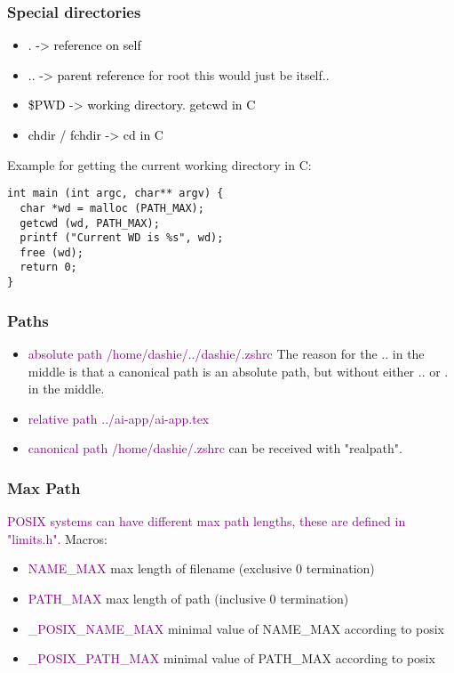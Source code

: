 \documentclass[main.tex,fontsize=8pt,paper=a4,paper=portrait,DIV=calc,]{scrartcl}
\begin{document}
\subsubsection{Special directories}
\begin{itemize}
\item \textcolor{black}{. -> reference on self}
\item \textcolor{black}{.. -> parent reference}\newline
  for root this would just be itself..
\item \textcolor{black}{\$PWD -> working directory. getcwd in C}
\item \textcolor{black}{chdir / fchdir -> cd in C}
\end{itemize} 
Example for getting the current working directory in C:
\begin{lstlisting}
int main (int argc, char** argv) {
  char *wd = malloc (PATH_MAX);
  getcwd (wd, PATH_MAX);
  printf ("Current WD is %s", wd);
  free (wd);
  return 0;
}
\end{lstlisting}

\subsubsection{Paths}
\begin{itemize}
\item \textcolor{purple}{absolute path /home/dashie/../dashie/.zshrc}\newline
  The reason for the .. in the middle is that a canonical path is an absolute path, but without either .. or . in the middle.
\item \textcolor{purple}{relative path ../ai-app/ai-app.tex}
\item \textcolor{purple}{canonical path /home/dashie/.zshrc}\newline
  can be received with "realpath".
\end{itemize}

\subsubsection{Max Path}
\textcolor{purple}{POSIX systems can have different max path lengths, these are defined in "limits.h".}\newline
Macros: 
\begin{itemize}
\item \textcolor{purple}{NAME\_MAX} max length of filename (exclusive 0 termination)
\item \textcolor{purple}{PATH\_MAX} max length of path (inclusive 0 termination)
\item \textcolor{purple}{\_POSIX\_NAME\_MAX} minimal value of NAME\_MAX according to posix
\item \textcolor{purple}{\_POSIX\_PATH\_MAX} minimal value of PATH\_MAX according to posix
\end{itemize} 
\end{document}
